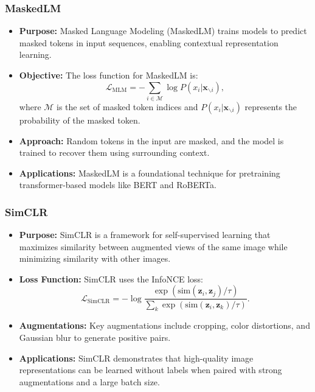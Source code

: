 \documentclass[12pt,a4paper]{article}
\begin{document}
\subsubsection{MaskedLM}
\begin{itemize}
    \item \textbf{Purpose:} Masked Language Modeling (MaskedLM) trains models to predict masked tokens in input sequences, enabling contextual representation learning.
    \item \textbf{Objective:} The loss function for MaskedLM is:
    \[
    \mathcal{L}_{\text{MLM}} = -\sum_{i \in \mathcal{M}} \log P(x_i | \mathbf{x}_{\backslash i}),
    \]
    where \(\mathcal{M}\) is the set of masked token indices and \(P(x_i | \mathbf{x}_{\backslash i})\) represents the probability of the masked token.
    \item \textbf{Approach:} Random tokens in the input are masked, and the model is trained to recover them using surrounding context.
    \item \textbf{Applications:} MaskedLM is a foundational technique for pretraining transformer-based models like BERT and RoBERTa.

\end{itemize}

\subsubsection{SimCLR}
\begin{itemize}
    \item \textbf{Purpose:} SimCLR is a framework for self-supervised learning that maximizes similarity between augmented views of the same image while minimizing similarity with other images.
    \item \textbf{Loss Function:} SimCLR uses the InfoNCE loss:
    \[
    \mathcal{L}_{\text{SimCLR}} = -\log \frac{\exp(\text{sim}(\mathbf{z}_i, \mathbf{z}_j) / \tau)}{\sum_{k} \exp(\text{sim}(\mathbf{z}_i, \mathbf{z}_k) / \tau)}.
    \]
    \item \textbf{Augmentations:} Key augmentations include cropping, color distortions, and Gaussian blur to generate positive pairs.
    \item \textbf{Applications:} SimCLR demonstrates that high-quality image representations can be learned without labels when paired with strong augmentations and a large batch size.
\end{itemize}
\end{document}
